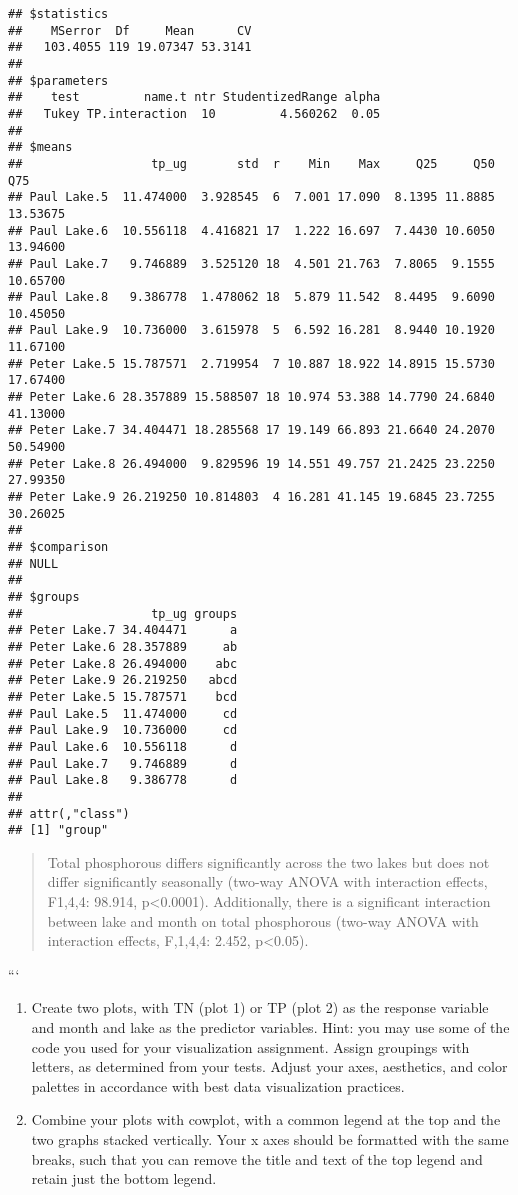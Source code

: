 \documentclass[]{article}
\begin{document}
\begin{verbatim}
## $statistics
##    MSerror  Df     Mean      CV
##   103.4055 119 19.07347 53.3141
## 
## $parameters
##    test         name.t ntr StudentizedRange alpha
##   Tukey TP.interaction  10         4.560262  0.05
## 
## $means
##                  tp_ug       std  r    Min    Max     Q25     Q50      Q75
## Paul Lake.5  11.474000  3.928545  6  7.001 17.090  8.1395 11.8885 13.53675
## Paul Lake.6  10.556118  4.416821 17  1.222 16.697  7.4430 10.6050 13.94600
## Paul Lake.7   9.746889  3.525120 18  4.501 21.763  7.8065  9.1555 10.65700
## Paul Lake.8   9.386778  1.478062 18  5.879 11.542  8.4495  9.6090 10.45050
## Paul Lake.9  10.736000  3.615978  5  6.592 16.281  8.9440 10.1920 11.67100
## Peter Lake.5 15.787571  2.719954  7 10.887 18.922 14.8915 15.5730 17.67400
## Peter Lake.6 28.357889 15.588507 18 10.974 53.388 14.7790 24.6840 41.13000
## Peter Lake.7 34.404471 18.285568 17 19.149 66.893 21.6640 24.2070 50.54900
## Peter Lake.8 26.494000  9.829596 19 14.551 49.757 21.2425 23.2250 27.99350
## Peter Lake.9 26.219250 10.814803  4 16.281 41.145 19.6845 23.7255 30.26025
## 
## $comparison
## NULL
## 
## $groups
##                  tp_ug groups
## Peter Lake.7 34.404471      a
## Peter Lake.6 28.357889     ab
## Peter Lake.8 26.494000    abc
## Peter Lake.9 26.219250   abcd
## Peter Lake.5 15.787571    bcd
## Paul Lake.5  11.474000     cd
## Paul Lake.9  10.736000     cd
## Paul Lake.6  10.556118      d
## Paul Lake.7   9.746889      d
## Paul Lake.8   9.386778      d
## 
## attr(,"class")
## [1] "group"
\end{verbatim}

\begin{quote}
Total phosphorous differs significantly across the two lakes but does
not differ significantly seasonally (two-way ANOVA with interaction
effects, F1,4,4: 98.914, p\textless{}0.0001). Additionally, there is a
significant interaction between lake and month on total phosphorous
(two-way ANOVA with interaction effects, F,1,4,4: 2.452,
p\textless{}0.05).
\end{quote}

```

\begin{enumerate}
\def\labelenumi{\arabic{enumi}.}
\setcounter{enumi}{6}
\item
  Create two plots, with TN (plot 1) or TP (plot 2) as the response
  variable and month and lake as the predictor variables. Hint: you may
  use some of the code you used for your visualization assignment.
  Assign groupings with letters, as determined from your tests. Adjust
  your axes, aesthetics, and color palettes in accordance with best data
  visualization practices.
\item
  Combine your plots with cowplot, with a common legend at the top and
  the two graphs stacked vertically. Your x axes should be formatted
  with the same breaks, such that you can remove the title and text of
  the top legend and retain just the bottom legend.
\end{enumerate}
\end{document}
